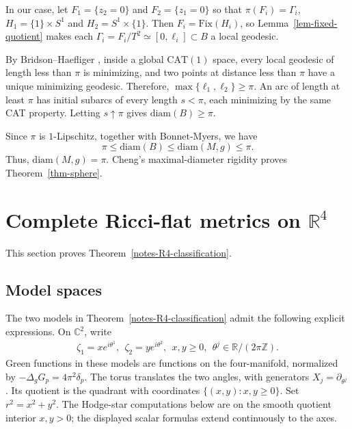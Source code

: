 \documentclass[letterpaper]{amsart}
\theoremstyle{definition}
\theoremstyle{remark}
\begin{document}
In our case, let $F_1= \{z_2=0\} $ and $F_2= \{ z_1=0\} $ so that $\pi (F_i) = \Gamma _i$, $H_1 = \{1\} \times S^1$ and $H_2= S^1 \times \{1\}$. Then $F_i=\mathrm{Fix}(H_i)$, so Lemma~\ref{lem-fixed-quotient} makes each $\Gamma_i=F_i/T^2\simeq[0,\ell_i]\subset B$ a local geodesic. 

By Bridson--Haefliger \cite[Proposition II.1.4]{notes-BH}, inside a global $\mathrm{CAT}(1)$ space, every local geodesic of length less than $\pi $ is minimizing, and two points at distance less than $\pi $ have a unique minimizing geodesic. Therefore, $\max \{ \ell_1, \ell_2 \} \geq \pi $. An arc of length at least $\pi$ has initial subarcs of every length $s<\pi$, each minimizing by the same CAT property. Letting $s\uparrow\pi$ gives $\mathrm{diam}(B)\ge\pi$.

Since $\pi $ is $1$-Lipschitz, together with Bonnet-Myers, we have 
$$\pi \leq \mathrm{diam}(B) \leq \mathrm{diam}(M, g) \leq \pi .$$
Thus, $\mathrm{diam}(M,g)=\pi$. Cheng's maximal-diameter rigidity \cite{notes-Cheng} proves Theorem~\ref{thm-sphere}.


\section{\texorpdfstring{Complete Ricci-flat metrics on $\mathbb R^4$}{Complete Ricci-flat metrics on R4}}\label{sec-R4}
This section proves Theorem~\ref{notes-R4-classification}.

\subsection{Model spaces}
The two models in Theorem~\ref{notes-R4-classification} admit the following explicit expressions. On $\mathbb C^2$, write
\begin{align*}
	\zeta _1 = x e ^{i \theta ^1},\ \  \zeta _2 = y e ^{i \theta ^2},\ \  x, y \geq 0,\ \ \theta ^{j} \in \mathbb{R} / (2 \pi \mathbb{Z}).
\end{align*} 
Green functions in these models are functions on the four-manifold, normalized by $-\Delta_gG_p=4\pi^2\delta_p$. The torus translates the two angles, with generators $X_j = \partial _{\theta ^{j}}$. Its quotient is the quadrant with coordinates $\{(x, y): x, y \geq 0 \}$. Set $r^2=x^2+y^2$. The Hodge-star computations below are on the smooth quotient interior $x,y>0$; the displayed scalar formulas extend continuously to the axes.
\end{document}
